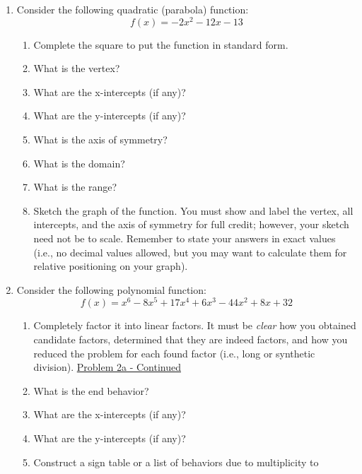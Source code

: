 \documentclass[letterpaper,12pt,fleqn]{article}
\begin{document}
\begin{enumerate}

\item Consider the following quadratic (parabola) function:
\[f(x)=-2x^2-12x-13\]
\begin{enumerate}
\item Complete the square to put the function in standard form.
\vspace{2in}
\item What is the vertex?
\vspace{1in}
\item What are the x-intercepts (if any)?
\vspace{2in}
\item What are the y-intercepts (if any)?
\vspace{1in}
\item What is the axis of symmetry?
\vspace{1in}
\item What is the domain?
\vspace{1in}
\item What is the range?
\vspace{1in}
\item Sketch the graph of the function. You must show and label the vertex,
all intercepts, and the axis of symmetry for full credit; however, your sketch
need not be to scale. Remember to state your answers in exact values (i.e., no
decimal values allowed, but you may want to calculate them for relative
positioning on your graph).
\end{enumerate}
\newpage
\item Consider the following polynomial function:
\[f(x)=x^6-8x^5+17x^4+6x^3-44x^2+8x+32\]
\begin{enumerate}
\item Completely factor it into linear factors. It must be \emph{clear} how
you obtained candidate factors, determined that they are indeed factors, and
how you reduced the problem for each found factor (i.e., long or synthetic
division).
\newpage
\underline{Problem 2a - Continued}
\newpage
\item What is the end behavior?
\vspace{1in}
\item What are the x-intercepts (if any)?
\vspace{1in}
\item What are the y-intercepts (if any)?
\vspace{1in}
\item Construct a sign table or a list of behaviors due to multiplicity to

\end{enumerate}
\end{enumerate}
\end{document}
